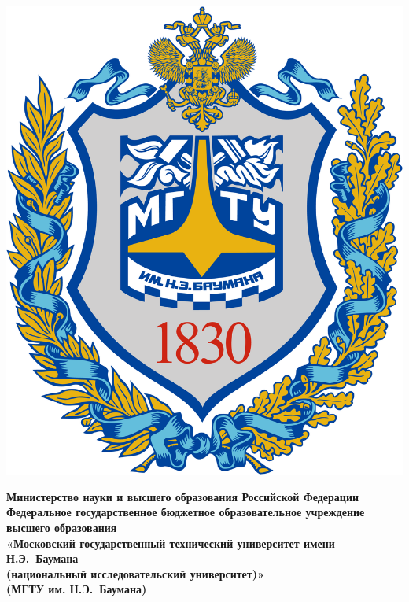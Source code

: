 \begin{titlepage}
	\thispagestyle{empty}
	\fontsize{12pt}{12pt}\selectfont
	\noindent \begin{minipage}{0.14\textwidth}
		\includegraphics[width=\linewidth]{img/b_logo.png}
	\end{minipage}
	\noindent\begin{minipage}{0.9\textwidth}\centering
		\textbf{Министерство науки и высшего образования Российской Федерации}\\
		\textbf{Федеральное государственное бюджетное образовательное учреждение высшего образования}\\
		\textbf{«Московский государственный технический университет имени Н.Э.~Баумана}\\
		\textbf{(национальный исследовательский университет)»}\\
		\textbf{(МГТУ им. Н.Э.~Баумана)}
	\end{minipage}
	
	\begin{center}
		\fontsize{12pt}{0.17\baselineskip}\selectfont
		\noindent\makebox[\linewidth]{\rule{\textwidth}{4pt}} \makebox[\linewidth]{\rule{\textwidth}{1pt}}
	\end{center}
	

\end{titlepage}
